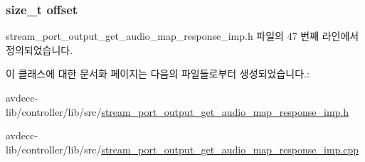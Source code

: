 \subsubsection[{\texorpdfstring{offset}{offset}}]{\setlength{\rightskip}{0pt plus 5cm}size\+\_\+t offset\hspace{0.3cm}{\ttfamily [private]}}\hypertarget{classavdecc__lib_1_1stream__port__output__get__audio__map__response__imp_aadb6d6eb83e646653a1402032e45dcab}{}\label{classavdecc__lib_1_1stream__port__output__get__audio__map__response__imp_aadb6d6eb83e646653a1402032e45dcab}


stream\+\_\+port\+\_\+output\+\_\+get\+\_\+audio\+\_\+map\+\_\+response\+\_\+imp.\+h 파일의 47 번째 라인에서 정의되었습니다.



이 클래스에 대한 문서화 페이지는 다음의 파일들로부터 생성되었습니다.\+:\begin{DoxyCompactItemize}
\item 
avdecc-\/lib/controller/lib/src/\hyperlink{stream__port__output__get__audio__map__response__imp_8h}{stream\+\_\+port\+\_\+output\+\_\+get\+\_\+audio\+\_\+map\+\_\+response\+\_\+imp.\+h}\item 
avdecc-\/lib/controller/lib/src/\hyperlink{stream__port__output__get__audio__map__response__imp_8cpp}{stream\+\_\+port\+\_\+output\+\_\+get\+\_\+audio\+\_\+map\+\_\+response\+\_\+imp.\+cpp}\end{DoxyCompactItemize}
